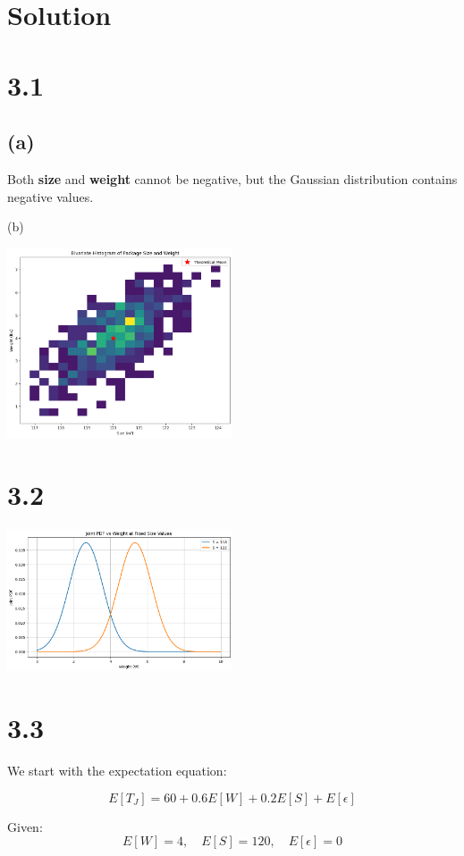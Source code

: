 \documentclass{../harvardml}
\theoremstyle{definition}
\theoremstyle{plain}
\newenvironment{solution}
  {\color{blue}\section*{Solution}}
{}
\begin{document}
\begin{solution}
	\section*{3.1}

\subsection*{(a)}
Both \textbf{size} and \textbf{weight} cannot be negative, but the Gaussian distribution contains negative values.

(b)
\begin{center}
    \includegraphics[width=0.5\textwidth]{images/3.1.png}
    \end{center}

\section*{3.2}

\begin{center}
    \includegraphics[width=0.5\textwidth]{images/3.2.png}
    \end{center}


\section*{3.3}
We start with the expectation equation:

\[
E[T_J] = 60 + 0.6E[W] + 0.2E[S] + E[\epsilon]
\]

Given:
\[
E[W] = 4, \quad E[S] = 120, \quad E[\epsilon] = 0
\]


\end{solution}
\end{document}
